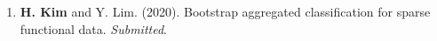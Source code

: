 \documentclass[11pt, a4paper]{awesome-cv} %
\begin{document}
%
%	
%	
%
\begin{enumerate}
	\item {\bf H. Kim} and Y. Lim. (2020). Bootstrap aggregated classification for sparse functional data. {\em Submitted}.
\end{enumerate}




\end{document}
